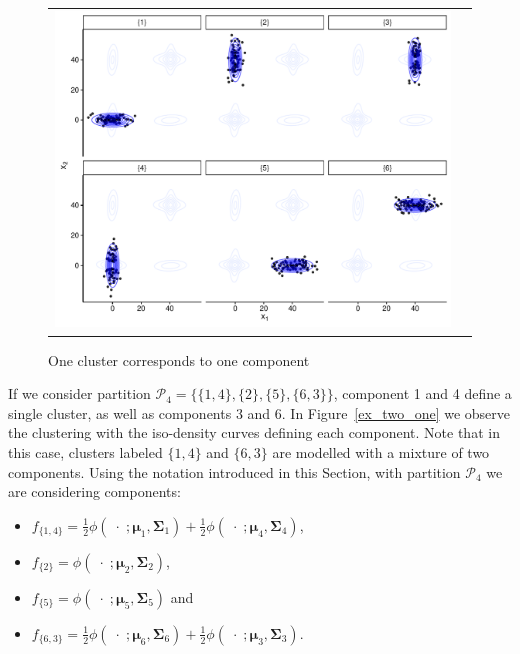\documentclass[10pt, a4paper]{article}
\newcommand{\m}[1]{\boldsymbol{#1}}
\begin{document}
\begin{spacing}{1.9}
\begin{figure}[h]
\begin{center}
\begin{tabular}{cc}
  \includegraphics[width=\textwidth]{figures/partition-example-part6.pdf} \\
 \end{tabular}
 \caption{One cluster corresponds to one component}\label{ex_one_one}
\end{center}
\end{figure}

If we consider partition $\mathcal{P}_4 = \{ \{1, 4\},\{2\}, \{5\}, \{6, 3\} \}$, component 1 and 4 define a single cluster, as well as components 3 and 6. In Figure~\ref{ex_two_one} we observe the clustering with the iso-density curves defining each component. Note that in this case, clusters labeled $\{1,4\}$ and $\{6, 3\}$ are modelled with a mixture of two components. Using the notation introduced in this Section, with partition $\mathcal{P}_4$ we are considering components: 
\begin{itemize}
\item $f_{\{1,4\}} = \frac{1}{2} \phi(\;\cdot\; ;  \m\mu_1, \m\Sigma_1) + \frac{1}{2} \phi(\;\cdot\; ;  \m\mu_4, \m\Sigma_4)$, 
\item $f_{\{2\}} = \phi(\;\cdot\; ;  \m\mu_2, \m\Sigma_2)$, 
\item $f_{\{5\}} = \phi(\;\cdot\; ;  \m\mu_5, \m\Sigma_5)$ and
\item $f_{\{6,3\}} = \frac{1}{2} \phi(\;\cdot\; ;  \m\mu_6, \m\Sigma_6) + \frac{1}{2} \phi(\;\cdot\; ;  \m\mu_3, \m\Sigma_3)$.
\end{itemize}


\end{spacing}
\end{document}

